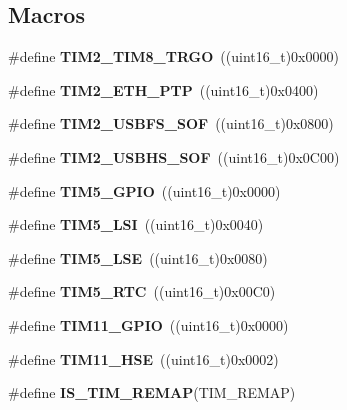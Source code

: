 \subsection*{Macros}
\begin{DoxyCompactItemize}
\item 
\mbox{\label{group___t_i_m___remap_ga4382cc14c8c5fba6ea1826bbac1c661a}} 
\#define {\bfseries T\+I\+M2\+\_\+\+T\+I\+M8\+\_\+\+T\+R\+GO}~((uint16\+\_\+t)0x0000)
\item 
\mbox{\label{group___t_i_m___remap_ga1136f862c583441e16dfd476bcd4d2dc}} 
\#define {\bfseries T\+I\+M2\+\_\+\+E\+T\+H\+\_\+\+P\+TP}~((uint16\+\_\+t)0x0400)
\item 
\mbox{\label{group___t_i_m___remap_gaea7d327d7d540269ee321a0657c01cd0}} 
\#define {\bfseries T\+I\+M2\+\_\+\+U\+S\+B\+F\+S\+\_\+\+S\+OF}~((uint16\+\_\+t)0x0800)
\item 
\mbox{\label{group___t_i_m___remap_ga49b8df3318ad0bf238953a2d8c6742af}} 
\#define {\bfseries T\+I\+M2\+\_\+\+U\+S\+B\+H\+S\+\_\+\+S\+OF}~((uint16\+\_\+t)0x0\+C00)
\item 
\mbox{\label{group___t_i_m___remap_ga64d3cf8f3b833eea9e78c79ed1322f2a}} 
\#define {\bfseries T\+I\+M5\+\_\+\+G\+P\+IO}~((uint16\+\_\+t)0x0000)
\item 
\mbox{\label{group___t_i_m___remap_gaf7e3c9769149255920a9088fd51c7e81}} 
\#define {\bfseries T\+I\+M5\+\_\+\+L\+SI}~((uint16\+\_\+t)0x0040)
\item 
\mbox{\label{group___t_i_m___remap_ga14bf08ccc822156ed44f9234825b6858}} 
\#define {\bfseries T\+I\+M5\+\_\+\+L\+SE}~((uint16\+\_\+t)0x0080)
\item 
\mbox{\label{group___t_i_m___remap_gad95bd2157c29f94703c0942ca3d2b767}} 
\#define {\bfseries T\+I\+M5\+\_\+\+R\+TC}~((uint16\+\_\+t)0x00\+C0)
\item 
\mbox{\label{group___t_i_m___remap_ga96850a4ae7ae9590f1ab9c04ec32bb06}} 
\#define {\bfseries T\+I\+M11\+\_\+\+G\+P\+IO}~((uint16\+\_\+t)0x0000)
\item 
\mbox{\label{group___t_i_m___remap_ga1d6d3f53290050b59b202e6d72af673a}} 
\#define {\bfseries T\+I\+M11\+\_\+\+H\+SE}~((uint16\+\_\+t)0x0002)
\item 
\#define {\bfseries I\+S\+\_\+\+T\+I\+M\+\_\+\+R\+E\+M\+AP}(T\+I\+M\+\_\+\+R\+E\+M\+AP)
\end{DoxyCompactItemize}


